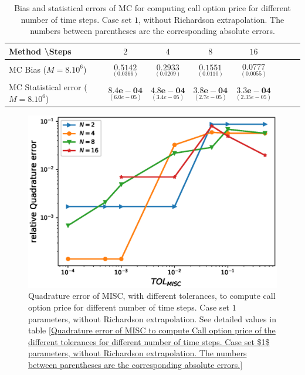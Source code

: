 \begin{table}[h!]
	\centering
	\begin{tabular}{l*{6}{c}r}
		Method \textbackslash  Steps            & $2$ & $4$ & $8$ & $16$  \\
		\hline
		MC Bias ($M=8.10^6$)   & 	$ \underset{( 0.0366)}{\mathbf{0.5142}}$  & $\underset{( 0.0209)}{\mathbf{0.2933}}$  & $\underset{( 0.0110)}{\mathbf{0.1551}}$ & $\underset{( 0.0055)}{\mathbf{0.0777}}$\\ 
		
		MC Statistical error ($M=8.10^6$)  &  $\underset{(  6.0e-05)} {\mathbf{8.4e-04}}$  & $\underset{(3.4e-05)} {\mathbf{4.8e-04}}$  & $\underset{(2.7e-05)} {\mathbf{ 3.8e-04}}$ & $\underset{( 2.35e-05)} {\mathbf{3.3e-04}}$	\\

		\hline
	\end{tabular}
	\caption{Bias and statistical errors of MC  for computing call option price  for different number of time steps. Case set $1$, without Richardson extrapolation. The numbers between parentheses are the corresponding absolute errors.}
	\label{Bias and Statistical errors of MC ($M=10^6$)  for computing Call option price  for different number of time steps. Case set 1, without Richardson extrapolation. The numbers between parentheses are the corresponding absolute errors.}
\end{table}






\FloatBarrier

\begin{figure}[h!]
	\centering
	\includegraphics[width=0.4\linewidth]{./figures/rBergomi_MISC_quadratre_error/vs_TOL/set1/relative_quad_error_wrt_MISC_TOL_set1_non_rich}
	
	
	\caption{Quadrature error of MISC, with different tolerances, to compute call option price for different number of time steps. Case  set $1$ parameters, without Richardson extrapolation. See detailed values  in table \ref{Quadrature error of MISC to compute Call option price of the different tolerances for different number of time steps. Case  set $1$ parameters, without Richardson extrapolation. The numbers between parentheses are the corresponding absolute errors.}}
	\label{fig:Quadrature_error_set1}
\end{figure}

